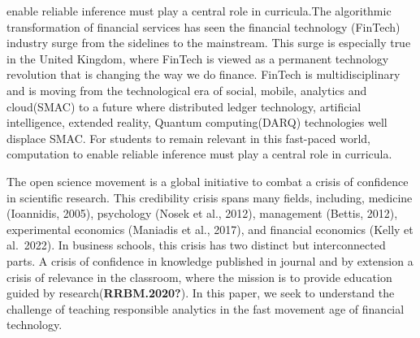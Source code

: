 \documentclass{article}
\begin{document}
{{{enable reliable inference must play a central role in
curricula.}{The algorithmic transformation of financial services has seen the financial technology (FinTech) industry surge from the sidelines to the mainstream. This surge is especially true in the United Kingdom, where FinTech is viewed as a permanent technology revolution that is changing the way we do finance. FinTech is multidisciplinary and is moving from the technological era of social, mobile, analytics and cloud(SMAC) to a future where distributed ledger technology, artificial intelligence, extended reality, Quantum computing(DARQ) technologies well displace SMAC. For students to remain relevant in this fast-paced world, computation to enable reliable inference must play a central role in curricula.}}\label{the-algorithmic-transformation-of-financial-services-has-seen-the-financial-technology-fintech-industry-surge-from-the-sidelines-to-the-mainstream.-this-surge-is-especially-true-in-the-united-kingdom-where-fintech-is-viewed-as-a-permanent-technology-revolution-that-is-changing-the-way-we-do-finance.-fintech-is-multidisciplinary-and-is-moving-from-the-technological-era-of-social-mobile-analytics-and-cloudsmac-to-a-future-where-distributed-ledger-technology-artificial-intelligence-extended-reality-quantum-computingdarq-technologies-well-displace-smac.-for-students-to-remain-relevant-in-this-fast-paced-world-computation-to-enable-reliable-inference-must-play-a-central-role-in-curricula.}}

The open science movement is a global initiative to combat a crisis of
confidence in scientific research. This credibility crisis spans many
fields, including, medicine (Ioannidis, 2005), psychology (Nosek et al.,
2012), management (Bettis, 2012), experimental economics (Maniadis et
al., 2017), and financial economics (Kelly et al.~2022). In business
schools, this crisis has two distinct but interconnected parts. A crisis
of confidence in knowledge published in journal and by extension a
crisis of relevance in the classroom, where the mission is to provide
education guided by research(\textbf{RRBM.2020?}). In this paper, we
seek to understand the challenge of teaching responsible analytics in
the fast movement age of financial technology.
\end{document}
